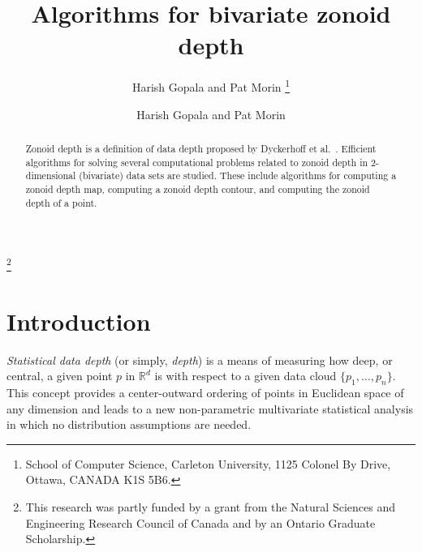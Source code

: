 \documentclass{elsart}
\author{Harish Gopala and Pat Morin%
	\thanks{School of Computer Science,
		Carleton University, 
		1125 Colonel By Drive, 
		Ottawa, CANADA K1S 5B6.
   		\email{\{hgopala,morin\}@scs.carleton.ca}
	}
}
\date{}
\begin{document}
\begin{frontmatter}
\title{Algorithms for bivariate zonoid depth}
\author{Harish Gopala and Pat Morin}
\address{School of Computer Science, Carleton University \\
	1125 Colonel By Drive, Ottawa, CANADA K1S~5B6}

\thanks[funding]{This research was partly funded by a grant from the
Natural Sciences and Engineering Research Council of Canada and by an
Ontario Graduate Scholarship.}

\begin{abstract}
Zonoid depth is a definition of data depth proposed by Dyckerhoff et
al.\ \cite{zonoid_data_depth_theory_and_computation}. 
Efficient algorithms for solving several computational problems
related to zonoid depth
in 2-dimensional (bivariate) data sets are studied. These include algorithms
for computing a zonoid depth map, computing a zonoid depth contour,
and computing the zonoid depth of a point.
\end{abstract}
\end{frontmatter}

\section{Introduction}\label{section_introduction}

\emph{Statistical data depth} (or simply, \emph{depth}) is a means of
measuring how deep, or central, a given point $p$ in $\mathbb{R}^d$ is
with respect to a given data cloud $\{p_1, \ldots, p_n\}$. This
concept provides a center-outward ordering of points in Euclidean
space of any dimension and leads to a new non-parametric multivariate
statistical analysis in which no distribution assumptions are needed.
\end{document}
